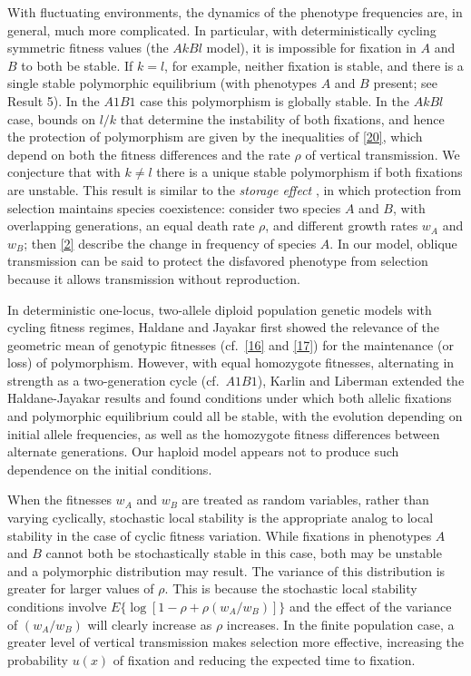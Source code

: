 \documentclass[9pt,twocolumn,twoside,lineno]{pnas-new}
\begin{document}
 With fluctuating environments, the dynamics of the phenotype frequencies are, in general, much more complicated. In particular, with deterministically cycling symmetric fitness values (the $AkBl$ model), it is impossible for fixation in $A$ and $B$ to both be stable. If $k=l$, for example, neither fixation is stable, and there is a single stable polymorphic equilibrium (with phenotypes $A$ and $B$ present; see Result 5). In the $A1B1$ case this  polymorphism is globally stable. In the $AkBl$ case, bounds on $l/k$ that determine the instability of both fixations, and hence the protection of polymorphism are given by the inequalities of \eqref{20}, which depend on both the fitness differences and the rate $\rho$ of vertical transmission. We conjecture that with $k\ne l$ there is a unique stable polymorphism if both fixations are unstable.
 This result is similar to the \emph{storage effect} \cite{chesson1981}, in which protection from selection maintains species coexistence: consider two species $A$ and $B$, with overlapping generations, an equal death rate $\rho$, and different growth rates $w_A$ and $w_B$; then \eqref{2} describe the change in frequency of species $A$. In our model, oblique transmission can be said to protect the disfavored phenotype from selection because it allows transmission without reproduction.
 
 In deterministic one-locus, two-allele diploid population genetic models with cycling fitness regimes, Haldane and Jayakar \cite{haldane1963polymorphism} first showed the relevance of the geometric mean of genotypic fitnesses (cf.\ \eqref{16} and \eqref{17}) for the maintenance (or loss) of polymorphism. However, with equal homozygote fitnesses, alternating in strength as a two-generation cycle (cf.\ $A1B1$), Karlin and Liberman \cite{karlin1975random} extended the Haldane-Jayakar results and found conditions under which both allelic fixations and polymorphic equilibrium could all be stable, with the evolution depending on initial allele frequencies, as well as the homozygote fitness differences between alternate generations. Our haploid model appears not to produce such dependence on the initial conditions.
 
 When the fitnesses $w_A$ and $w_B$ are treated as random variables, rather than varying cyclically, stochastic local stability is the appropriate analog to local stability in the case of cyclic fitness variation. While fixations in phenotypes $A$ and $B$ cannot both be stochastically stable in this case, both may be unstable and a polymorphic distribution may result. The variance of this distribution is greater for larger values of $\rho$. This is because the  stochastic local stability conditions involve $E\bigl\{\log[1-\rho+\rho(w_A/w_B)]\bigr\}$ and the effect of the variance of $(w_A/w_B)$ will clearly increase as $\rho$ increases. In the finite population case, a greater level of vertical transmission makes selection more effective, increasing the probability $u(x)$ of fixation and reducing the expected time to fixation.
 
\end{document}
